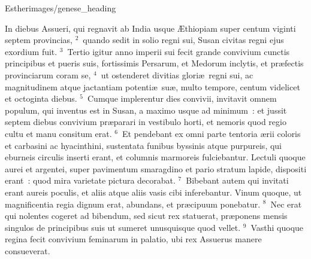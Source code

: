 {Esther}{images/genese_heading}


\lettrine[lines=10,image=true,loversize=0.05,lraise=-0.03]{I}{}n diebus Assueri, qui regnavit ab India usque \AE thiopiam super centum viginti septem provincias,
${}^{2}$~quando sedit in solio regni sui, Susan civitas regni ejus exordium fuit.
${}^{3}$~Tertio igitur anno imperii sui fecit grande convivium cunctis principibus et pueris suis, fortissimis Persarum, et Medorum inclytis, et pr\ae fectis provinciarum coram se,
${}^{4}$~ut ostenderet divitias glori\ae\ regni sui, ac magnitudinem atque jactantiam potenti\ae\ su\ae , multo tempore, centum videlicet et octoginta diebus.
${}^{5}$~Cumque implerentur dies convivii, invitavit omnem populum, qui inventus est in Susan, a maximo usque ad minimum~: et jussit septem diebus convivium pr\ae parari in vestibulo horti, et nemoris quod regio cultu et manu consitum erat.
${}^{6}$~Et pendebant ex omni parte tentoria \ae rii coloris et carbasini ac hyacinthini, sustentata funibus byssinis atque purpureis, qui eburneis circulis inserti erant, et columnis marmoreis fulciebantur. Lectuli quoque aurei et argentei, super pavimentum smaragdino et pario stratum lapide, dispositi erant~: quod mira varietate pictura decorabat.
${}^{7}$~Bibebant autem qui invitati erant aureis poculis, et aliis atque aliis vasis cibi inferebantur. Vinum quoque, ut magnificentia regia dignum erat, abundans, et pr\ae cipuum ponebatur.
${}^{8}$~Nec erat qui nolentes cogeret ad bibendum, sed sicut rex statuerat, pr\ae ponens mensis singulos de principibus suis ut sumeret unusquisque quod vellet.
${}^{9}$~Vasthi quoque regina fecit convivium feminarum in palatio, ubi rex Assuerus manere consueverat.


